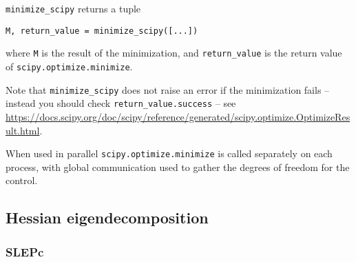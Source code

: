 \documentclass[11pt]{article}
\begin{document}
\texttt{minimize\_scipy} returns a tuple
\begin{lstlisting}
M, return_value = minimize_scipy([...])
\end{lstlisting}
where \texttt{M} is the result of the minimization, and \texttt{return\_value}
is the return value of \texttt{scipy.optimize.minimize}.

Note that \texttt{minimize\_scipy} does not raise an error if the minimization
fails -- instead you should check \texttt{return\_value.success} -- see
\url{https://docs.scipy.org/doc/scipy/reference/generated/scipy.optimize.OptimizeResult.html}.

When used in parallel \texttt{scipy.optimize.minimize} is called separately on
each process, with global communication used to gather the degrees of freedom
for the control.

\subsection{Hessian eigendecomposition}

\subsubsection{SLEPc}
\end{document}
